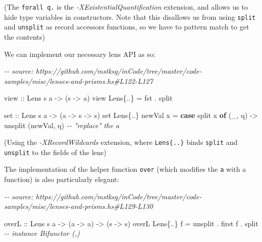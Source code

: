 \documentclass[]{article}
\newenvironment{Shaded}{}{}
\newcommand{\CommentTok}[1]{\textcolor[rgb]{0.38,0.63,0.69}{\textit{#1}}}
\newcommand{\DataTypeTok}[1]{\textcolor[rgb]{0.56,0.13,0.00}{#1}}
\newcommand{\FunctionTok}[1]{\textcolor[rgb]{0.02,0.16,0.49}{#1}}
\newcommand{\KeywordTok}[1]{\textcolor[rgb]{0.00,0.44,0.13}{\textbf{#1}}}
\newcommand{\NormalTok}[1]{#1}
\newcommand{\OperatorTok}[1]{\textcolor[rgb]{0.40,0.40,0.40}{#1}}
\newcommand{\OtherTok}[1]{\textcolor[rgb]{0.00,0.44,0.13}{#1}}
\begin{document}
(The \texttt{forall\ q.} is the \emph{-XExistentialQuantification} extension,
and allows us to hide type variables in constructors. Note that this disallows
us from using \texttt{split} and \texttt{unsplit} as record accessors functions,
so we have to pattern match to get the contents)

We can implement our necessary lens API as so:

\begin{Shaded}
\begin{Highlighting}[]
\CommentTok{{-}{-} source: https://github.com/mstksg/inCode/tree/master/code{-}samples/misc/lenses{-}and{-}prisms.hs\#L122{-}L127}

\OtherTok{view ::} \DataTypeTok{Lens\textquotesingle{}}\NormalTok{ s a }\OtherTok{{-}\textgreater{}}\NormalTok{ (s }\OtherTok{{-}\textgreater{}}\NormalTok{ a)}
\NormalTok{view }\DataTypeTok{Lens\textquotesingle{}}\NormalTok{\{}\OperatorTok{..}\NormalTok{\} }\OtherTok{=} \FunctionTok{fst} \OperatorTok{.}\NormalTok{ split}

\OtherTok{set ::} \DataTypeTok{Lens\textquotesingle{}}\NormalTok{ s a }\OtherTok{{-}\textgreater{}}\NormalTok{ (a }\OtherTok{{-}\textgreater{}}\NormalTok{ s }\OtherTok{{-}\textgreater{}}\NormalTok{ s)}
\NormalTok{set }\DataTypeTok{Lens\textquotesingle{}}\NormalTok{\{}\OperatorTok{..}\NormalTok{\} newVal x }\OtherTok{=} \KeywordTok{case}\NormalTok{ split x }\KeywordTok{of}
\NormalTok{    (\_, q) }\OtherTok{{-}\textgreater{}}\NormalTok{ unsplit (newVal, q)      }\CommentTok{{-}{-} "replace" the \textasciigrave{}a\textasciigrave{}}
\end{Highlighting}
\end{Shaded}

(Using the \emph{-XRecordWildcards} extension, where
\texttt{Lens\textquotesingle{}\{..\}} binds \texttt{split} and \texttt{unsplit}
to the fields of the lens)

The implementation of the helper function \texttt{over} (which modifies the
\texttt{a} with a function) is also particularly elegant:

\begin{Shaded}
\begin{Highlighting}[]
\CommentTok{{-}{-} source: https://github.com/mstksg/inCode/tree/master/code{-}samples/misc/lenses{-}and{-}prisms.hs\#L129{-}L130}

\OtherTok{overL ::} \DataTypeTok{Lens\textquotesingle{}}\NormalTok{ s a }\OtherTok{{-}\textgreater{}}\NormalTok{ (a }\OtherTok{{-}\textgreater{}}\NormalTok{ a) }\OtherTok{{-}\textgreater{}}\NormalTok{ (s }\OtherTok{{-}\textgreater{}}\NormalTok{ s)}
\NormalTok{overL }\DataTypeTok{Lens\textquotesingle{}}\NormalTok{\{}\OperatorTok{..}\NormalTok{\}  f }\OtherTok{=}\NormalTok{ unsplit }\OperatorTok{.}\NormalTok{ first f }\OperatorTok{.}\NormalTok{ split   }\CommentTok{{-}{-} instance Bifunctor (,)}
\end{Highlighting}
\end{Shaded}
\end{document}

